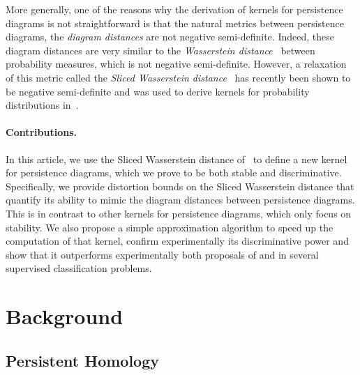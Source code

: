 \documentclass[11pt]{article}
\begin{document}
More generally, one of the reasons why the derivation of kernels for persistence diagrams is not  
straightforward is that the natural metrics between persistence diagrams, the {\em diagram distances}
are not negative semi-definite. Indeed, these diagram distances are very similar to the 
{\em Wasserstein distance}~\cite[\S6]{Villani09} between probability measures, which is not negative
semi-definite. However, a relaxation of this metric called the {\em Sliced Wasserstein distance}~\cite{Rabin11}
has recently been shown to be negative semi-definite and was used to derive kernels for probability distributions
in~\cite{Kolouri16}.    

\paragraph{Contributions.} In this article, 
we use the Sliced Wasserstein
distance of~\cite{Rabin11} to define a new kernel for persistence diagrams, which we prove
to be both stable and discriminative. Specifically, we provide distortion bounds on the Sliced Wasserstein distance that quantify its ability to 
mimic the diagram distances between persistence diagrams. This
is in contrast to other kernels for persistence diagrams, which only focus on
stability. We also propose a simple approximation algorithm
to speed up the computation of that kernel, confirm experimentally its discriminative power and show 
that it outperforms experimentally both proposals of \cite{Kusano16} and \cite{Reininghaus15} in several supervised classification problems.


\section{Background}

\subsection{Persistent Homology}
\label{sec:persHom}

\newcommand{\dg}{\operatorname{Dg}}
\newcommand{\distb}{\operatorname{d_b}}
\newcommand{\cost}{\operatorname{c}}
\end{document}
